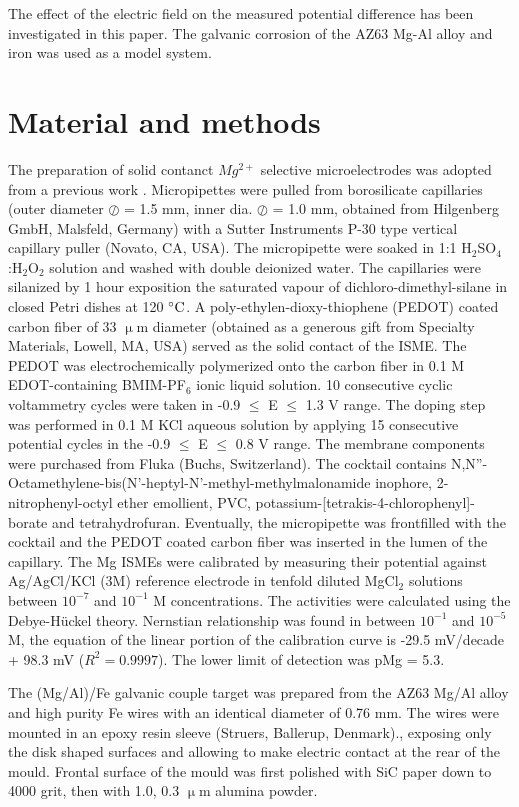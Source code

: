 \documentclass[3p]{elsarticle}
\begin{document}
The effect of the electric field on the measured potential difference has been investigated in this paper. The galvanic corrosion of the AZ63 Mg-Al alloy and iron was used as a model system.

\section{Material and methods}

The preparation of solid contanct $Mg^{2+}$ selective microelectrodes was adopted from a previous work \cite{overmg3}. Micropipettes were pulled from borosilicate capillaries (outer diameter $\oslash$ = 1.5 mm, inner dia. $\oslash$ = 1.0 mm, obtained from Hilgenberg GmbH, Malsfeld, Germany) with a Sutter Instruments P-30 type vertical capillary puller (Novato, CA, USA). The micropipette were soaked in 1:1 H$_2$SO$_4$:H$_2$O$_2$ solution and washed with double deionized water. The capillaries were silanized by 1 hour exposition the saturated vapour of dichloro-dimethyl-silane in closed Petri dishes at 120 $\celsius$. A poly-ethylen-dioxy-thiophene (PEDOT) coated carbon fiber of 33 $\upmu$m diameter (obtained as a generous gift from Specialty Materials, Lowell, MA, USA) served as the solid contact of the ISME. The PEDOT was electrochemically polymerized onto the carbon fiber in 0.1 M EDOT-containing BMIM-PF$_6$ ionic liquid solution. 10 consecutive cyclic voltammetry cycles were taken in -0.9 $\leq$ E $\leq$ 1.3 V range. The doping step was performed in 0.1 M KCl aqueous solution by applying 15 consecutive potential cycles in the -0.9 $\leq$ E $\leq$ 0.8 V range. The membrane components were purchased from Fluka (Buchs, Switzerland). The cocktail contains N,N''-Octamethylene-bis(N'-heptyl-N'-methyl-methylmalonamide inophore, 2-nitrophenyl-octyl ether emollient, PVC, potassium-[tetrakis-4-chlorophenyl]-borate and tetrahydrofuran. Eventually, the micropipette was frontfilled with the cocktail and the PEDOT coated carbon fiber was inserted in the lumen of the capillary.
The Mg ISMEs were calibrated by measuring their potential against Ag/AgCl/KCl (3M) reference electrode in tenfold diluted MgCl$_2$ solutions between $10^{-7}$ and $10^{-1}$ M concentrations. The activities were calculated using the Debye-Hückel theory. Nernstian relationship was found in between $10^{-1}$ and $10^{-5}$ M, the equation of the linear portion of the calibration curve is -29.5 mV/decade + 98.3 mV ($R^2=0.9997$). The lower limit of detection was pMg = 5.3. 

The (Mg/Al)/Fe galvanic couple target was prepared from the AZ63 Mg/Al alloy and high purity Fe wires with an identical diameter of 0.76 mm. The wires were mounted in an epoxy resin sleeve (Struers, Ballerup, Denmark)., exposing only the disk shaped surfaces and allowing to make electric contact at the rear of the mould. Frontal surface of the mould was first polished with SiC paper down to 4000 grit, then with 1.0, 0.3 $\upmu$m alumina powder.
\end{document}
